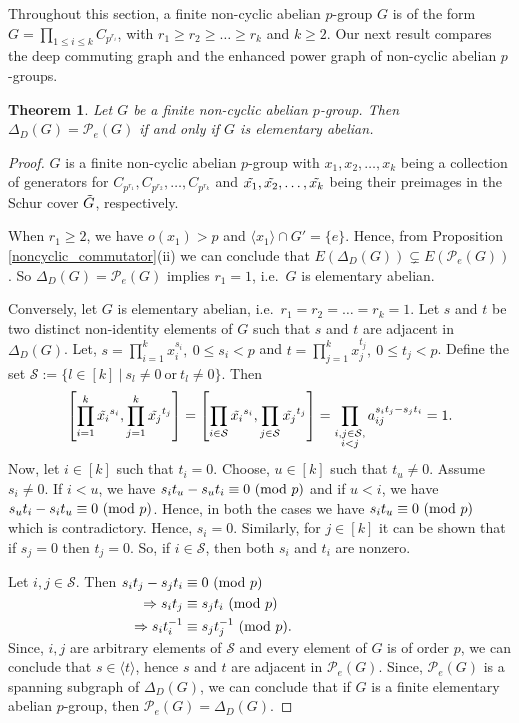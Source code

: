 \documentclass[12pt,a4paper]{article}
\newtheorem{theorem}{Theorem}[section]
\begin{document}
Throughout this section, a finite non-cyclic abelian $p$-group $G$ is of the form $G=\prod_{1\leq i \leq k}C_{p^{r_i}}$, with $r_1\geq r_2\geq \dots \geq r_k$ and $k\geq 2$. Our next result compares the deep commuting graph and the enhanced power graph of non-cyclic abelian $p$-groups. 
\begin{theorem}\label{elementary_abelian_p}
Let $G$ be a finite non-cyclic abelian $p$-group. Then $\Delta_D(G)=\mathcal{P}_e(G)$ if and only if $G$ is elementary abelian.
\end{theorem}
\begin{proof}
$G$ is a finite non-cyclic abelian $p$-group with $x_1, x_2, \dots, x_k$ being a collection of generators for $C_{p^{r_1}},C_{p^{r_2}},\dots,C_{p^{r_k}}$ and $\Tilde{x_1},\Tilde{x_2},\dots,\Tilde{x_k}$ being their preimages in the Schur cover $\Tilde{G}$, respectively. 

When $r_1\geq 2$, we have $o(x_1)>p$ and $\langle x_1\rangle\cap G'=\{e\}$. Hence, from Proposition \ref{noncyclic_commutator}(ii) we can conclude that $E(\Delta_D(G))\subsetneq E(\mathcal{P}_e(G))$. So $\Delta_D(G)=\mathcal{P}_e(G)$ implies $r_1=1$, i.e.~$G$ is elementary abelian.

Conversely, let $G$ is elementary abelian, i.e.~$r_1=r_2= \dots =r_k=1$. Let $s$ and $t$ be two distinct non-identity elements of $G$ such that $s$ and $t$ are adjacent in $\Delta_D(G)$. Let, $s=\prod_{i=1}^kx_i^{s_i},~0\leq s_i<p$ and $t=\prod_{j=1}^kx_j^{t_j},~0\leq t_j<p$. Define the set $\mathcal{S}:=\{l\in[k]~|~s_l\neq 0~\text{or}~t_l\neq 0\}$. Then 
\[
\left[\prod_{i=1}^k\Tilde{x_i}^{s_i},\prod_{j=1}^k\Tilde{x_j}^{t_j}\right]
=\left[\prod_{i\in\mathcal{S}}\Tilde{x_i}^{s_i},\prod_{j\in\mathcal{S}}\Tilde{x_j}^{t_j}\right]
=\prod_{\substack{i,j\in\mathcal{S},\\ i<j}}a_{ij}^{s_it_j-s_jt_i}=1.
\]
Now, let $i\in[k]$ such that $t_i=0$. Choose, $u\in[k]$ such that $t_u\neq 0$. Assume $s_i\neq 0$. If $i<u$, we have $s_it_u-s_ut_i\equiv 0~({\rm mod}~p)$ and if $u<i$, we have $s_ut_i-s_it_u\equiv 0~({\rm mod}~p)$. Hence, in both the cases we have $s_it_u\equiv 0~({\rm mod}~p)$ which is contradictory. Hence, $s_i=0$. Similarly, for $j\in[k]$ it can be shown that if $s_j=0$ then $t_j=0$. So, if $i\in \mathcal{S}$, then both $s_i$ and $t_i$ are nonzero.  

Let $i,j\in\mathcal{S}$. Then $\begin{aligned}[t]
s_it_j-s_jt_i &\equiv 0~({\rm mod}~p)\\
\Rightarrow s_it_j &\equiv s_jt_i~({\rm mod}~p)\\
\Rightarrow s_it_i^{-1} &\equiv s_jt_j^{-1}~({\rm mod}~p).\\
\end{aligned}
$\\
Since, $i,j$ are arbitrary elements of $\mathcal{S}$ and every element of $G$ is of order $p$, we can conclude that $s\in \langle t\rangle$, hence $s$ and $t$ are adjacent in $\mathcal{P}_e(G)$. Since, $\mathcal{P}_e(G)$ is a spanning subgraph of $\Delta_D(G)$, we can conclude that if $G$ is a finite elementary abelian $p$-group, then  $\mathcal{P}_e(G)=\Delta_D(G)$.   
\end{proof}
\end{document}

